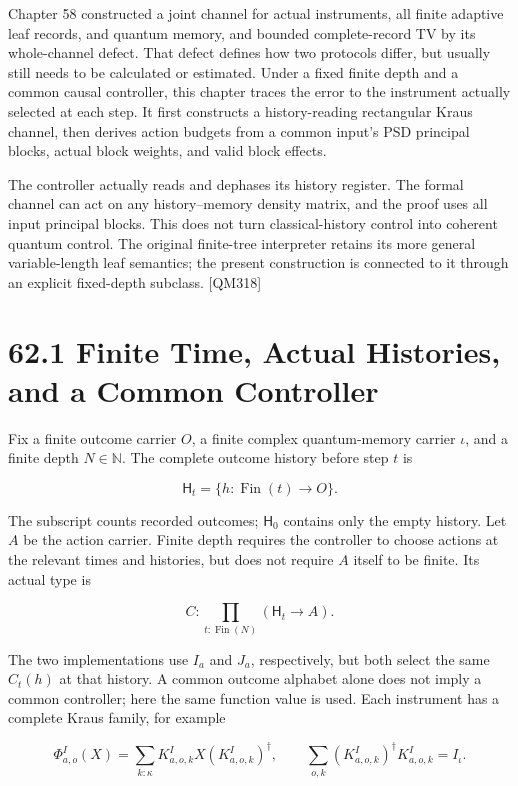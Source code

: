 \documentclass[
  11pt,
  oneside]{book}
\begin{document}
Chapter 58 constructed a joint channel for actual instruments, all
finite adaptive leaf records, and quantum memory, and bounded
complete-record TV by its whole-channel defect. That defect defines how
two protocols differ, but usually still needs to be calculated or
estimated. Under a fixed finite depth and a common causal controller,
this chapter traces the error to the instrument actually selected at
each step. It first constructs a history-reading rectangular Kraus
channel, then derives action budgets from a common input's PSD principal
blocks, actual block weights, and valid block effects.

The controller actually reads and dephases its history register. The
formal channel can act on any history--memory density matrix, and the
proof uses all input principal blocks. This does not turn
classical-history control into coherent quantum control. The original
finite-tree interpreter retains its more general variable-length leaf
semantics; the present construction is connected to it through an
explicit fixed-depth subclass. {[}QM318{]}

\section{62.1 Finite Time, Actual Histories, and a Common Controller}

Fix a finite outcome carrier \(O\), a finite complex quantum-memory
carrier \(\iota\), and a finite depth \(N\in\mathbb N\). The complete
outcome history before step \(t\) is

\[
\mathsf H_t=\{h:\operatorname{Fin}(t)\to O\}.
\]

The subscript counts recorded outcomes; \(\mathsf H_0\) contains only
the empty history. Let \(A\) be the action carrier. Finite depth
requires the controller to choose actions at the relevant times and
histories, but does not require \(A\) itself to be finite. Its actual
type is

\[
C:\prod_{t:\operatorname{Fin}(N)}(\mathsf H_t\to A).
\]

The two implementations use \(I_a\) and \(J_a\), respectively, but both
select the same \(C_t(h)\) at that history. A common outcome alphabet
alone does not imply a common controller; here the same function value
is used. Each instrument has a complete Kraus family, for example

\[
\Phi^I_{a,o}(X)=\sum_{k:\kappa}K^I_{a,o,k}X(K^I_{a,o,k})^\dagger,
\qquad
\sum_{o,k}(K^I_{a,o,k})^\dagger K^I_{a,o,k}=I_\iota.
\]
\end{document}
